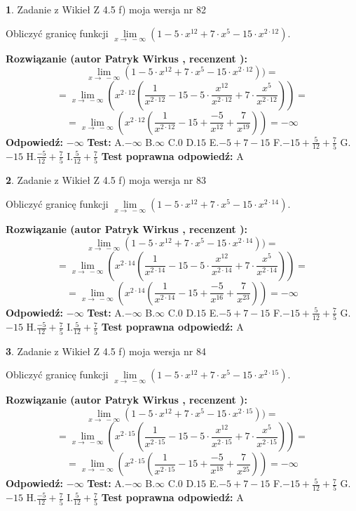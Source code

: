 \documentclass[12pt, a4paper]{article}
\theoremstyle{definition} %
\newtheorem{zad}{}
\newcommand{\zadStart}[1]{\begin{zad}#1\newline}
\newcommand{\zadStop}{\end{zad}}
\newcommand{\rozwStart}[2]{\noindent \textbf{Rozwiązanie (autor #1 , recenzent #2): }\newline}
\newcommand{\rozwStop}{\newline}
\newcommand{\odpStart}{\noindent \textbf{Odpowiedź:}\newline}
\newcommand{\odpStop}{\newline}
\newcommand{\testStart}{\noindent \textbf{Test:}\newline}
\newcommand{\testStop}{\newline}
\newcommand{\kluczStart}{\noindent \textbf{Test poprawna odpowiedź:}\newline}
\newcommand{\kluczStop}{\newline}
\begin{document}
\zadStart{Zadanie z Wikieł Z 4.5 f) moja wersja nr 82}



Obliczyć granicę funkcji  $\lim\limits_{x\to\ -\infty}(1 - 5 \cdot x^{12}+7 \cdot x^{5}- 15 \cdot x^{2\cdot12})$.
\zadStop
\rozwStart{Patryk Wirkus}{}
$$\lim\limits_{x\to\ -\infty}(1 - 5 \cdot x^{12}+7 \cdot x^{5}- 15 \cdot x^{2\cdot12}))=$$
$$=\lim\limits_{x\to\ -\infty}(x^{2\cdot12}(\frac{1}{x^{2\cdot12}}-15 -5 \cdot \frac{x^{12}}{x^{2\cdot12}}+7 \cdot \frac{x^{5}}{x^{2\cdot12}}))=$$
$$=\lim\limits_{x\to\ -\infty}(x^{2\cdot12}(\frac{1}{x^{2\cdot12}}-15 + \frac{-5}{x^{12}}+ \frac{7}{x^{19}}))=-\infty$$
\rozwStop
\odpStart
$-\infty$
\odpStop
\testStart
A.$-\infty$ B.$\infty$ C.$0$ D.$15$ E.$-5 + 7 - 15$
F.$-15+\frac{5}{12}+\frac{7}{5}$ G.$-15$
H.$\frac{-5}{12}+\frac{7}{5}$
I.$\frac{5}{12}+\frac{7}{5}$
\testStop
\kluczStart
A
\kluczStop



\zadStart{Zadanie z Wikieł Z 4.5 f) moja wersja nr 83}



Obliczyć granicę funkcji  $\lim\limits_{x\to\ -\infty}(1 - 5 \cdot x^{12}+7 \cdot x^{5}- 15 \cdot x^{2\cdot14})$.
\zadStop
\rozwStart{Patryk Wirkus}{}
$$\lim\limits_{x\to\ -\infty}(1 - 5 \cdot x^{12}+7 \cdot x^{5}- 15 \cdot x^{2\cdot14}))=$$
$$=\lim\limits_{x\to\ -\infty}(x^{2\cdot14}(\frac{1}{x^{2\cdot14}}-15 -5 \cdot \frac{x^{12}}{x^{2\cdot14}}+7 \cdot \frac{x^{5}}{x^{2\cdot14}}))=$$
$$=\lim\limits_{x\to\ -\infty}(x^{2\cdot14}(\frac{1}{x^{2\cdot14}}-15 + \frac{-5}{x^{16}}+ \frac{7}{x^{23}}))=-\infty$$
\rozwStop
\odpStart
$-\infty$
\odpStop
\testStart
A.$-\infty$ B.$\infty$ C.$0$ D.$15$ E.$-5 + 7 - 15$
F.$-15+\frac{5}{12}+\frac{7}{5}$ G.$-15$
H.$\frac{-5}{12}+\frac{7}{5}$
I.$\frac{5}{12}+\frac{7}{5}$
\testStop
\kluczStart
A
\kluczStop



\zadStart{Zadanie z Wikieł Z 4.5 f) moja wersja nr 84}



Obliczyć granicę funkcji  $\lim\limits_{x\to\ -\infty}(1 - 5 \cdot x^{12}+7 \cdot x^{5}- 15 \cdot x^{2\cdot15})$.
\zadStop
\rozwStart{Patryk Wirkus}{}
$$\lim\limits_{x\to\ -\infty}(1 - 5 \cdot x^{12}+7 \cdot x^{5}- 15 \cdot x^{2\cdot15}))=$$
$$=\lim\limits_{x\to\ -\infty}(x^{2\cdot15}(\frac{1}{x^{2\cdot15}}-15 -5 \cdot \frac{x^{12}}{x^{2\cdot15}}+7 \cdot \frac{x^{5}}{x^{2\cdot15}}))=$$
$$=\lim\limits_{x\to\ -\infty}(x^{2\cdot15}(\frac{1}{x^{2\cdot15}}-15 + \frac{-5}{x^{18}}+ \frac{7}{x^{25}}))=-\infty$$
\rozwStop
\odpStart
$-\infty$
\odpStop
\testStart
A.$-\infty$ B.$\infty$ C.$0$ D.$15$ E.$-5 + 7 - 15$
F.$-15+\frac{5}{12}+\frac{7}{5}$ G.$-15$
H.$\frac{-5}{12}+\frac{7}{5}$
I.$\frac{5}{12}+\frac{7}{5}$
\testStop
\kluczStart
A
\kluczStop
\end{document}

